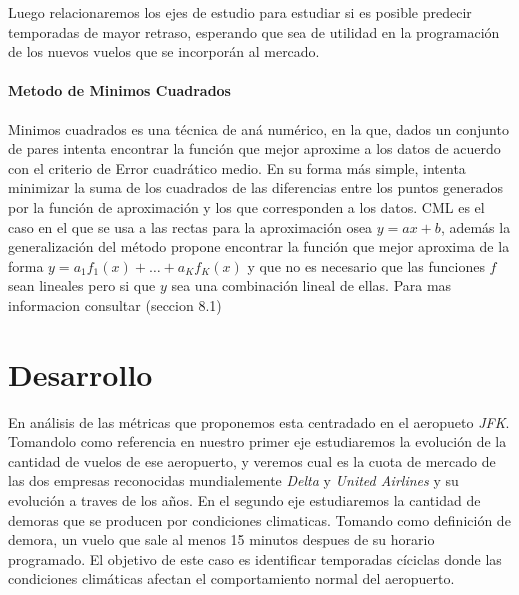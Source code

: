 \documentclass{endm}
\begin{document}
Luego relacionaremos los ejes de estudio para estudiar si es posible predecir temporadas de mayor retraso, esperando que sea de utilidad en la programaci\'on de los nuevos vuelos que se incorporán al mercado.


\paragraph{Metodo de Minimos Cuadrados}

Minimos cuadrados es una t\'ecnica de an\'a num\'erico, en la que, dados un conjunto de pares intenta encontrar la funci\'on que mejor aproxime a los datos de acuerdo con el criterio de Error cuadr\'atico medio. En su forma m\'as simple, intenta minimizar la suma de los cuadrados de las diferencias entre los puntos generados por la funci\'on de aproximaci\'on y los que corresponden a los datos. CML es el caso en el que se usa a las rectas para la aproximaci\'on osea $y = ax + b$, adem\'as la generalizaci\'on del m\'etodo propone encontrar la funci\'on que mejor aproxima de la forma $y = a_1f_1(x) + \dots + a_Kf_K(x)$ y que no es necesario que las funciones $f$ sean lineales pero si que $y$ sea una combinaci\'on lineal de ellas. Para mas informacion consultar  \cite{bf} (seccion 8.1)

\section{Desarrollo}

En an\'alisis de las m\'etricas que proponemos esta centradado en el aeropueto \textit{JFK}. Tomandolo como referencia en nuestro primer eje estudiaremos la evoluci\'on de la cantidad de vuelos de ese aeropuerto, y veremos cual es la cuota de mercado de las dos empresas reconocidas mundialemente \textit{Delta} y \textit{United Airlines} y su evoluci\'on a traves de los a\~nos. En el segundo eje estudiaremos la cantidad de demoras que se producen por condiciones climaticas. Tomando como definici\'on de demora, un vuelo que sale al menos 15 minutos despues de su horario programado. El objetivo de este caso es identificar temporadas c\'iciclas donde las condiciones clim\'aticas afectan el comportamiento normal del aeropuerto.
\end{document}

